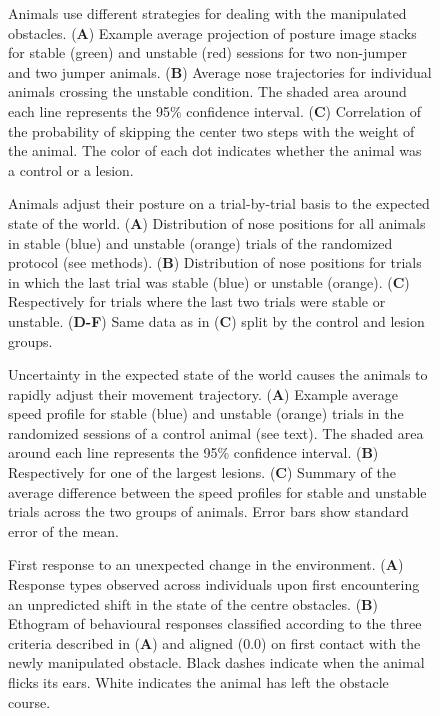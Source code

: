 \begin{figure}
\centering

\caption{Animals use different strategies for dealing with the manipulated obstacles. (\textbf{A}) Example average projection of posture image stacks for stable (green) and unstable (red) sessions for two non-jumper and two jumper animals. (\textbf{B}) Average nose trajectories for individual animals crossing the unstable condition. The shaded area around each line represents the 95\% confidence interval. (\textbf{C}) Correlation of the probability of skipping the center two steps with the weight of the animal. The color of each dot indicates whether the animal was a control or a lesion.}
\label{fig:jumping}
\end{figure}

\begin{figure}
\centering

\caption{Animals adjust their posture on a trial-by-trial basis to the expected state of the world. (\textbf{A}) Distribution of nose positions for all animals in stable (blue) and unstable (orange) trials of the randomized protocol (see methods). (\textbf{B}) Distribution of nose positions for trials in which the last trial was stable (blue) or unstable (orange). (\textbf{C}) Respectively for trials where the last two trials were stable or unstable. (\textbf{D-F}) Same data as in (\textbf{C}) split by the control and lesion groups.}
\label{fig:random}
\end{figure}

\begin{figure}
\centering

\caption{Uncertainty in the expected state of the world causes the animals to rapidly adjust their movement trajectory. (\textbf{A}) Example average speed profile for stable (blue) and unstable (orange) trials in the randomized sessions of a control animal (see text). The shaded area around each line represents the 95\% confidence interval. (\textbf{B}) Respectively for one of the largest lesions. (\textbf{C}) Summary of the average difference between the speed profiles for stable and unstable trials across the two groups of animals. Error bars show standard error of the mean.}
\label{fig:speed}
\end{figure}

\begin{figure}
\centering

\caption{First response to an unexpected change in the environment. (\textbf{A}) Response types observed across individuals upon first encountering an unpredicted shift in the state of the centre obstacles. (\textbf{B}) Ethogram of behavioural responses classified according to the three criteria described in (\textbf{A}) and aligned (0.0) on first contact with the newly manipulated obstacle. Black dashes indicate when the animal flicks its ears. White indicates the animal has left the obstacle course.}
\label{fig:ethogram}
\end{figure}
